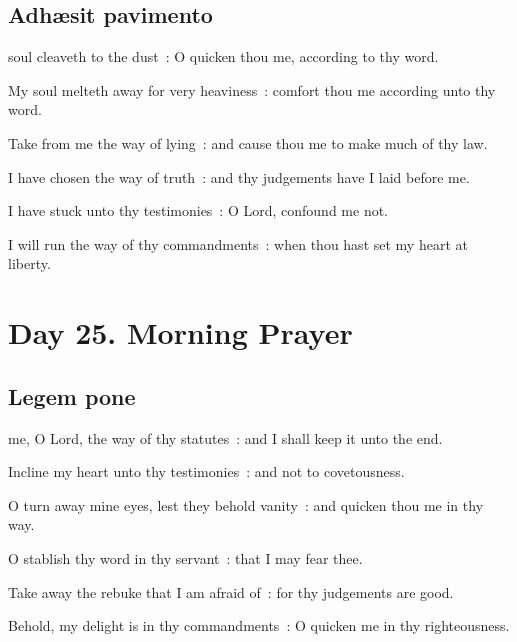 \subsection{Adh{\ae}sit pavimento}


 soul cleaveth to the dust~: O quicken thou me, according to thy word.\par
{}
My soul melteth away for very heaviness~: comfort thou me according unto thy word.\par
{}Take from me the way of lying~: and cause thou me to make much of thy law.\par
{}I have chosen the way of truth~: and thy judgements have I laid before me.\par
{}I have stuck unto thy testimonies~: O Lord, confound me not.\par
{}I will run the way of thy commandments~: when thou hast set my heart at liberty.\par



\clearpage
\section*{Day 25. Morning Prayer}

\subsection{Legem pone}


 me, O Lord, the way of thy statutes~: and I shall keep it unto the end.\par
{}
Incline my heart unto thy testimonies~: and not to covetousness.\par
{}O turn away mine eyes, lest they behold vanity~: and quicken thou me in thy way.\par
{}O stablish thy word in thy servant~: that I may fear thee.\par
{}Take away the rebuke that I am afraid of~: for thy judgements are good.\par
{}Behold, my delight is in thy commandments~: O quicken me in thy righteousness.\par

